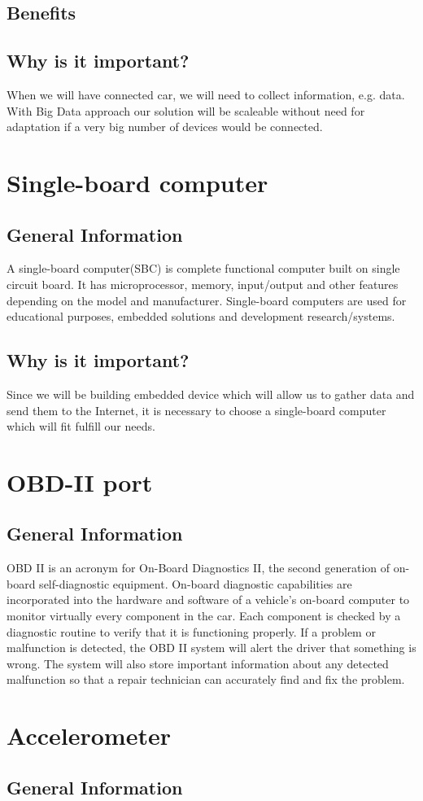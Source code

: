 \subsection{Benefits}
\subsection{Why is it important?}
When we will have connected car, we will need to collect information, e.g. data. With Big Data approach our solution will be scaleable without need for adaptation if a very big number of devices would be connected.
\section{Single-board computer}
\subsection{General Information}
A single-board computer(SBC) is complete functional computer built on single circuit board. It has microprocessor, memory, input/output and other features depending on the model and manufacturer. Single-board computers are used for educational purposes, embedded solutions and development research/systems.
\subsection{Why is it important?}
Since we will be building embedded device which will allow us to gather data and send them to the Internet, it is necessary to choose a single-board computer which will fit fulfill our needs.

\section{OBD-II port}
\subsection{General Information}
OBD II is an acronym for On-Board Diagnostics II, the second generation of on-board self-diagnostic equipment. On-board diagnostic capabilities are incorporated into the hardware and software of a vehicle's on-board computer to monitor virtually every component in the car. Each component is checked by a diagnostic routine to verify that it is functioning properly. If a problem or malfunction is detected, the OBD II system will alert the driver that something is wrong. The system will also store important information about any detected malfunction so that a repair technician can accurately find and fix the problem.
\subsection{}

\section{Accelerometer}
\subsection{General Information}




